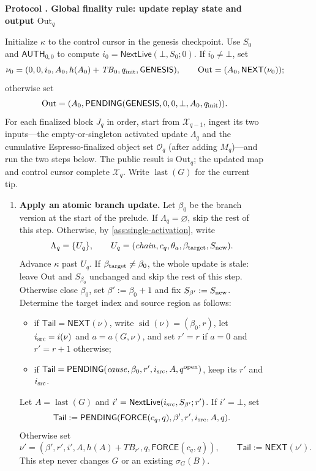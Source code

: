 \documentclass[11pt,a4paper]{article}
\newcommand{\TB}{\mathit{TB}}
\newcommand{\tagg}[1]{\ensuremath{\mathsf{#1}}}
\newcounter{protocol}
\newenvironment{protocol}[3][htbp]{\begin{figure}[#1]\refstepcounter{protocol}\label{#2}
\begin{mdframed}[linewidth=.6pt,skipabove=0pt,skipbelow=0pt,
innertopmargin=7pt,innerbottommargin=7pt]\small
\textbf{Protocol \theprotocol. #3}\par\smallskip}{\end{mdframed}\end{figure}}
\begin{document}
\begin{protocol}[H]{alg:global-rule}{Global finality rule: update replay state and output $\mathrm{Out}_q$}
Initialize $\kappa$ to the control cursor in the genesis checkpoint. Use
$S_0$ and $\tagg{AUTH}_{0,0}$ to compute
$i_0=\tagg{NextLive}(\bot,S_0;0)$.  If $i_0\ne\bot$, set
\[
 \nu_0=(0,0,i_0,A_0,h(A_0)+\TB_0,q_{\rm init},\tagg{GENESIS}),
 \qquad \mathrm{Out}=(A_0,\tagg{NEXT}(\nu_0));
\]
otherwise set
\[
 \mathrm{Out}=(A_0,
 \tagg{PENDING}(\tagg{GENESIS},0,0,\bot,A_0,q_{\rm init})).
\]
For each finalized block $J_q$ in order, start from $\mathcal X_{q-1}$,
ingest its two inputs---the empty-or-singleton activated update
$\Lambda_q$ and the cumulative
Espresso-finalized object set $\mathcal O_q$ (after adding $M_q$)---and
run the two steps below. The public result is $\mathrm{Out}_q$; the
updated map and control cursor complete $\mathcal X_q$. Write
$\operatorname{last}(G)$ for the current tip.
\begin{enumerate}[label=\textbf{\arabic*)},itemsep=3pt]
\item \textbf{Apply an atomic branch update.}
Let $\beta_0$ be the branch version at the start of the prelude. If
$\Lambda_q=\varnothing$, skip the rest of this step. Otherwise, by
\cref{ass:single-activation}, write
\[
 \Lambda_q=\{U_q\},\qquad
 U_q=(\mathit{chain},c_q,\theta_a,\beta_{\rm target},S_{\rm new}).
\]
Advance $\kappa$ past $U_q$. If $\beta_{\rm target}\ne\beta_0$, the
whole update is stale: leave $\mathrm{Out}$ and $S_{\beta_0}$ unchanged
and skip the rest of this step. Otherwise close $\beta_0$, set
$\beta':=\beta_0+1$ and fix $S_{\beta'}:=S_{\rm new}$. Determine the target
index and source region as follows:
  \begin{itemize}[itemsep=1pt]
  \item if $\mathsf{Tail}=\tagg{NEXT}(\nu)$, write
  $\operatorname{sid}(\nu)=(\beta_0,r)$, let $i_{\rm src}=i(\nu)$ and
  $a=a(G,\nu)$, and set $r'=r$ if $a=0$ and $r'=r+1$ otherwise;
  \item if $\mathsf{Tail}=\tagg{PENDING}
  (\mathit{cause},\beta_0,r',i_{\rm src},A,q^{\rm open})$, keep its $r'$ and
  $i_{\rm src}$.
  \end{itemize}
Let $A=\operatorname{last}(G)$ and
$i'=\tagg{NextLive}(i_{\rm src},S_{\beta'};r')$.  If $i'=\bot$, set
\[
 \mathsf{Tail}:=\tagg{PENDING}
 (\tagg{FORCE}(c_q,q),\beta',r',i_{\rm src},A,q).
\]
Otherwise set
\[
 \nu'=(\beta',r',i',A,h(A)+\TB_{r'},q,
       \tagg{FORCE}(c_q,q)),
 \qquad \mathsf{Tail}:=\tagg{NEXT}(\nu').
\]
This step never changes $G$ or an existing $\sigma_G(B)$.


\end{enumerate}
\end{protocol}
\end{document}
